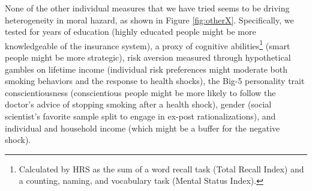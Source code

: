 \documentclass[11pt]{article}
\begin{document}
None of the other individual measures that we have tried seems to be driving heterogeneity in moral hazard, as shown in Figure \ref{fig:otherX}.
Specifically, we tested for years of education (highly educated people might be more knowledgeable of the insurance system), a proxy of cognitive abilities\footnote{Calculated by HRS as the sum of a word recall task (Total Recall Index) and a counting, naming, and vocabulary task (Mental Status Index).
} (smart people might be more strategic), risk aversion measured through hypothetical gambles on lifetime income (individual risk preferences might moderate both smoking behaviors and the response to health shocks), the Big-5 personality trait conscientiousness (conscientious people might be more likely to follow the doctor's advice of stopping smoking after a health shock), gender (social scientist's favorite sample split to engage in ex-post rationalizations), and individual and household income (which might be a buffer for the negative shock).%
\end{document}
